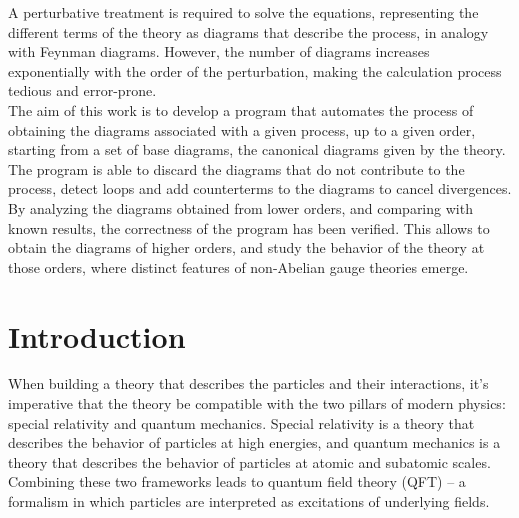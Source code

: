 \documentclass[11pt,a4paper,twoside,pdf]{article}
\numberwithin{equation}{section}
\begin{document}
\begin{center}
\begin{minipage}{0.8\linewidth}
A perturbative treatment is required to solve the equations, representing the different
terms of the theory as diagrams that describe the process, in analogy with Feynman diagrams.
However, the number of diagrams increases exponentially with the order of the perturbation,
making the calculation process tedious and error-prone. \\

The aim of this work is to develop a program \cite{Liu_Computational_tools_for_2025} that automates the process of
obtaining the diagrams associated with a given process, up to a given order,
starting from a set of base diagrams, the canonical diagrams given by the
theory. The program is able to discard the diagrams that do not contribute to the
process, detect loops and add counterterms to the diagrams to cancel divergences. \\

By analyzing the diagrams obtained from lower orders, and comparing with known
results, the correctness of the program has been verified. This allows to obtain
the diagrams of higher orders, and study the behavior of the theory at those
orders, where distinct features of non-Abelian gauge theories emerge.

\end{minipage}

\newpage

\end{center}


\pagestyle{empty}       %
\tableofcontents
\setcounter{page}{0}       %


\pagestyle{fancy}
\fancyhead[RO,LE]{\leftmark}
\fancyhead[LO,RE]{\thepage}
\fancyfoot{}

\newpage

\section{Introduction}

When building a theory that describes the particles and their interactions, 
it's imperative that the theory be compatible with the two pillars of modern physics:
special relativity and quantum mechanics. Special relativity is a theory 
that describes the behavior of particles at high energies, and quantum 
mechanics is a theory that describes the behavior of particles at atomic and subatomic scales.
Combining these two frameworks leads to quantum field theory (QFT) – a formalism 
in which particles are interpreted as excitations of underlying fields.
\end{document}
